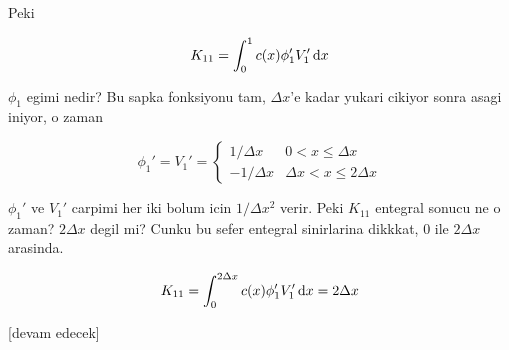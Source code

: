 \documentclass[12pt,fleqn]{article}\usepackage{../../common}
\begin{document}
Peki

$$
K_{11} = \int _{0}^{1} c(x) \phi_1' V_1' \,\mathrm{d} x
$$

$\phi_1$ egimi nedir? Bu sapka fonksiyonu tam, $\Delta x$'e kadar yukari
cikiyor sonra asagi iniyor, o zaman

$$
\phi_1' = V_1' =
\left\{ \begin{array}{rc}
1/\Delta x & 0 < x \le \Delta x \\
-1/\Delta x & \Delta x < x \le 2\Delta x 
\end{array} \right.
$$

$\phi_1'$ ve $V_1'$ carpimi her iki bolum icin $1/\Delta x^2$ verir. Peki
$K_{11}$ entegral sonucu ne o zaman? $2 \Delta x$ degil mi? Cunku bu sefer
entegral sinirlarina dikkkat, 0 ile $2\Delta x$ arasinda. 

$$
K_{11} = \int _{0}^{2\Delta x} c(x) \phi_1' V_1' \,\mathrm{d} x = 2\Delta x
$$












[devam edecek]
\end{document}
